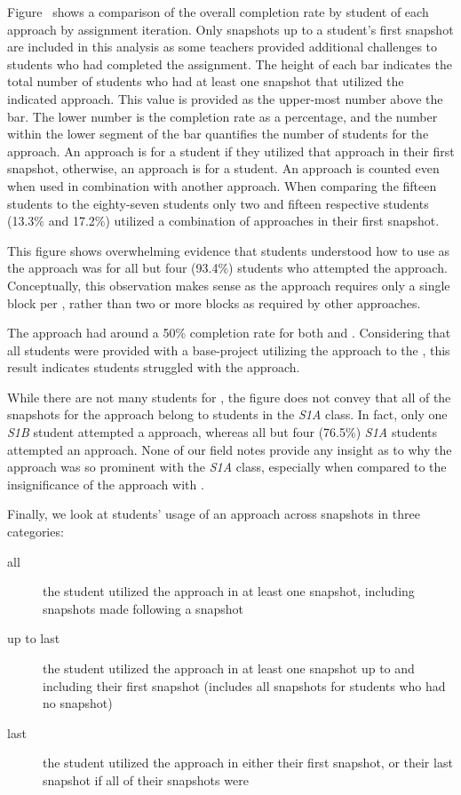 Figure~ shows a comparison of the
overall completion rate by student of each approach by assignment
iteration. Only snapshots up to a student's first \com{} snapshot are included
in this analysis as some teachers provided additional challenges to students
who had completed the assignment. The height of each bar indicates the total
number of students who had at least one snapshot that utilized the indicated
approach. This value is provided as the upper-most number above the bar. The
lower number is the completion rate as a percentage, and the number within the
lower segment of the bar quantifies the number of \com{} students for the
approach. An approach is \com{} for a student if they utilized that approach in
their first \com{} snapshot, otherwise, an approach is \incom{} for a
student. An approach is counted even when used in combination with another
approach. When comparing the fifteen \sone{} \com{} students to the
eighty-seven \stwo{} \com{} students only two and fifteen respective \com{}
students (13.3\% and 17.2\%) utilized a combination of approaches in their
first \com{} snapshot.

This figure shows overwhelming evidence that students understood how to use
\glideto{} as the approach was \com{} for all but four (93.4\%) students who
attempted the approach. Conceptually, this observation makes sense as the
approach requires only a single block per \catch{}, rather than two or more
blocks as required by other approaches.

The \abs{} approach had around a 50\% completion rate for both \sone{} and
\stwo{}. Considering that all students were provided with a base-project
utilizing the \abs{} approach to \catch{} the \zebra{}, this result indicates
students struggled with the \abs{} approach.

While there are not many students for \sone{}, the figure does not convey that
all of the \com{} snapshots for the \rel{} approach belong to students in the
\emph{S1A} class. In fact, only one \emph{S1B} student attempted a \rel{}
approach, whereas all but four (76.5\%) \emph{S1A} students attempted an \abs{}
approach. None of our field notes provide any insight as to why the \rel{}
approach was so prominent with the \emph{S1A} class, especially when compared
to the insignificance of the \rel{} approach with \stwo{}.

Finally, we look at students' usage of an approach across snapshots in three
categories:

\begin{description}
\item[all] the student utilized the approach in at least one snapshot,
  including snapshots made following a \com{} snapshot
\item[up to last] the student utilized the approach in at least one snapshot up
  to and including their first \com{} snapshot (includes all snapshots for
  students who had no \com{} snapshot)
\item[last] the student utilized the approach in either their first \com{}
  snapshot, or their last snapshot if all of their snapshots were \incom{}
\end{description}

